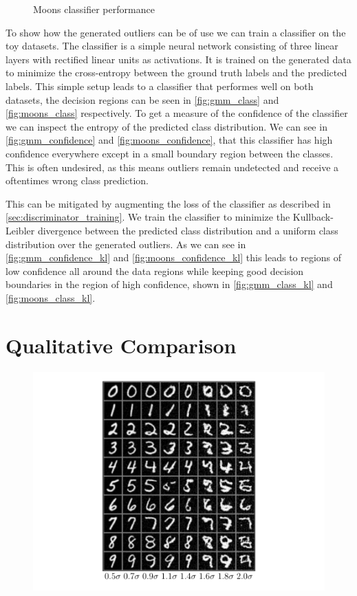 \begin{figure}[htpb]
    \caption{Moons classifier performance}%
    \label{fig:classifier_moons}
\end{figure}

To show how the generated outliers can be of use we can train a classifier on
the toy datasets. The classifier is a simple neural network consisting of three
linear layers with rectified linear units as activations. It is trained on the
generated data to minimize the cross-entropy between the ground truth labels
and the predicted labels. This simple setup leads to a classifier that
performes well on both datasets, the decision regions can be seen in
\autoref{fig:gmm_class} and \autoref{fig:moons_class} respectively. To get a
measure of the confidence of the classifier we can inspect the entropy of the
predicted class distribution. We can see in \autoref{fig:gmm_confidence} and
\autoref{fig:moons_confidence}, that this classifier has high confidence
everywhere except in a small boundary region between the classes. This is often
undesired, as this means outliers remain undetected and receive a oftentimes
wrong class prediction. 

This can be mitigated by augmenting the loss of the classifier as described in
\autoref{sec:discriminator_training}. We train the classifier to minimize the
Kullback-Leibler divergence between the predicted class distribution and a
uniform class distribution over the generated outliers. As we can see in
\autoref{fig:gmm_confidence_kl} and \autoref{fig:moons_confidence_kl} this
leads to regions of low confidence all around the data regions while keeping
good decision boundaries in the region of high confidence, shown in
\autoref{fig:gmm_class_kl} and \autoref{fig:moons_class_kl}.

\section{Qualitative Comparison}%
\label{sec:qualitative_comparison}

\begin{figure}[htpb]
    \centering
    \includegraphics[width=0.8\linewidth]{figures/samples/emnist_inc_distance.pdf}
    \caption{}%
    \label{fig:emnist_sample_sigma}
\end{figure}

